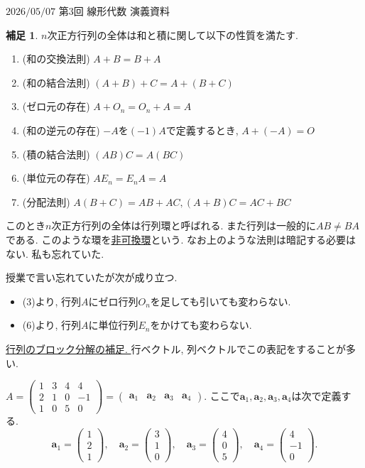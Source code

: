 \documentclass[dvipdfmx,a4paper,11pt]{article} %
\theoremstyle{definition}
\newtheorem{rem}[thm]{補足}
\begin{document}
$\boxed{\text{2026/05/07 第3回 線形代数 演義資料}}$
\begin{rem}
$n$次正方行列の全体は和と積に関して以下の性質を満たす. 
\begin{enumerate}[label=(\arabic*).]
\setlength{\parskip}{0cm}
 \setlength{\itemsep}{0pt} 
\item (和の交換法則) $A+B = B+A$
\item (和の結合法則) $(A+B) + C = A + (B+C)$
\item (ゼロ元の存在) $A+O_n = O_n+A=A$
\item (和の逆元の存在) $-A$を$(-1)A$で定義するとき, $A + (-A)=O$
\item (積の結合法則) $(AB) C = A (BC)$
\item (単位元の存在) $AE_n =E_nA=A$
\item (分配法則) $A(B+C)=AB + AC, (A+B)C = AC + BC$
\end{enumerate}
このとき$n$次正方行列の全体は行列環と呼ばれる.
 また行列は一般的に$AB \neq BA$である. このような環を\underline{非可換環}という. 
なお上のような法則は暗記する必要はない. 私も忘れていた.

授業で言い忘れていたが次が成り立つ.
\begin{itemize}
\setlength{\parskip}{0cm}
 \setlength{\itemsep}{0pt} 
\item (3)より, 行列$A$にゼロ行列$O_n$を足しても引いても変わらない.
\item (6)より, 行列$A$に単位行列$E_n$をかけても変わらない. 
\end{itemize}

 \end{rem}
\underline{行列のブロック分解の補足. }
行ベクトル, 列ベクトルでこの表記をすることが多い.

$
A=
  \begin{pmatrix}
 1 &3&4&4 \\
 2&1&0&-1\\
 1&0&5&0
 \end{pmatrix}
 = 
   \begin{pmatrix}
\bm{a}_1&\bm{a}_2&\bm{a}_3&\bm{a}_4
 \end{pmatrix}
$.
ここで$\bm{a}_1, \bm{a}_2, \bm{a}_3, \bm{a}_4$は次で定義する. 
$$
\bm{a}_1 = 
  \begin{pmatrix}
 1 \\2 \\1
 \end{pmatrix},\quad
 \bm{a}_2 = 
  \begin{pmatrix}
 3 \\1 \\0
 \end{pmatrix},\quad
  \bm{a}_3 = 
  \begin{pmatrix}
 4 \\0 \\5
 \end{pmatrix},\quad
  \bm{a}_4 = 
  \begin{pmatrix}
 4 \\-1 \\0
 \end{pmatrix}.
$$
\end{document}

